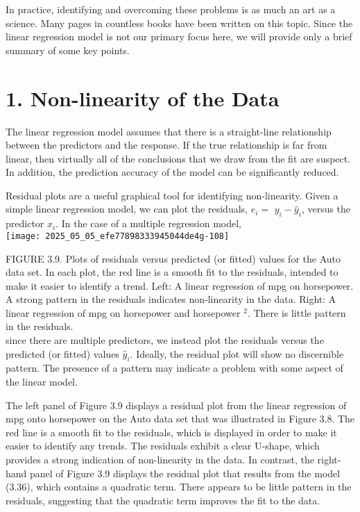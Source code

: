 \documentclass[10pt]{article}
\begin{document}
In practice, identifying and overcoming these problems is as much an art as a science. Many pages in countless books have been written on this topic. Since the linear regression model is not our primary focus here, we will provide only a brief summary of some key points.

\section*{1. Non-linearity of the Data}
The linear regression model assumes that there is a straight-line relationship between the predictors and the response. If the true relationship is far from linear, then virtually all of the conclusions that we draw from the fit are suspect. In addition, the prediction accuracy of the model can be significantly reduced.

Residual plots are a useful graphical tool for identifying non-linearity. Given a simple linear regression model, we can plot the residuals, $e_{i}=$ $y_{i}-\hat{y}_{i}$, versus the predictor $x_{i}$. In the case of a multiple regression model,\\
\texttt{[image: 2025\_05\_05\_efe77898333945044de4g-108]}

FIGURE 3.9. Plots of residuals versus predicted (or fitted) values for the Auto data set. In each plot, the red line is a smooth fit to the residuals, intended to make it easier to identify a trend. Left: A linear regression of mpg on horsepower. A strong pattern in the residuals indicates non-linearity in the data. Right: A linear regression of mpg on horsepower and horsepower ${ }^{2}$. There is little pattern in the residuals.\\
since there are multiple predictors, we instead plot the residuals versus the predicted (or fitted) values $\hat{y}_{i}$. Ideally, the residual plot will show no discernible pattern. The presence of a pattern may indicate a problem with some aspect of the linear model.

The left panel of Figure 3.9 displays a residual plot from the linear regression of mpg onto horsepower on the Auto data set that was illustrated in Figure 3.8. The red line is a smooth fit to the residuals, which is displayed in order to make it easier to identify any trends. The residuals exhibit a clear U-shape, which provides a strong indication of non-linearity in the data. In contrast, the right-hand panel of Figure 3.9 displays the residual plot that results from the model (3.36), which contains a quadratic term. There appears to be little pattern in the residuals, suggesting that the quadratic term improves the fit to the data.
\end{document}
